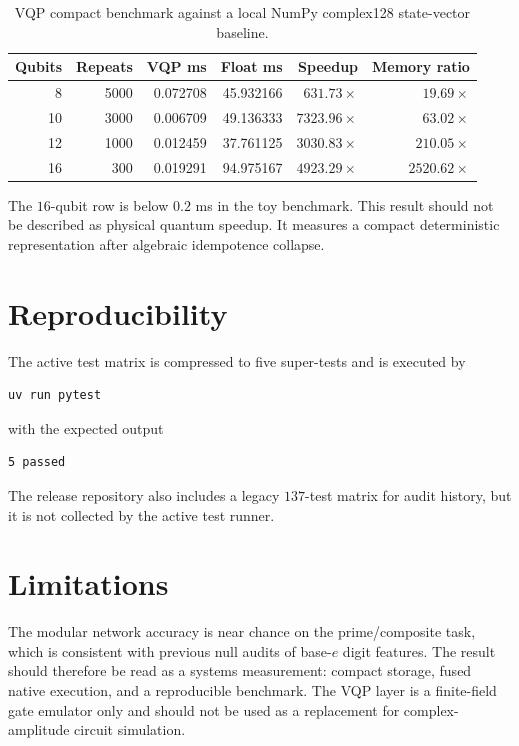 \documentclass[11pt]{article}
\begin{document}
\begin{table}[h]
\centering
\caption{VQP compact benchmark against a local NumPy complex128 state-vector
baseline.}
\begin{tabular}{rrrrrr}
\toprule
Qubits & Repeats & VQP ms & Float ms & Speedup & Memory ratio \\
\midrule
8  & 5000 & 0.072708 & 45.932166 & $631.73\times$ & $19.69\times$ \\
10 & 3000 & 0.006709 & 49.136333 & $7323.96\times$ & $63.02\times$ \\
12 & 1000 & 0.012459 & 37.761125 & $3030.83\times$ & $210.05\times$ \\
16 & 300  & 0.019291 & 94.975167 & $4923.29\times$ & $2520.62\times$ \\
\bottomrule
\end{tabular}
\end{table}

The $16$-qubit row is below $0.2$ ms in the toy benchmark.  This result should
not be described as physical quantum speedup.  It measures a compact
deterministic representation after algebraic idempotence collapse.

\section{Reproducibility}

The active test matrix is compressed to five super-tests and is executed by
\begin{verbatim}
uv run pytest
\end{verbatim}
with the expected output
\begin{verbatim}
5 passed
\end{verbatim}
The release repository also includes a legacy $137$-test matrix for audit
history, but it is not collected by the active test runner.

\section{Limitations}

The modular network accuracy is near chance on the prime/composite task, which
is consistent with previous null audits of base-$e$ digit features.  The result
should therefore be read as a systems measurement: compact storage, fused
native execution, and a reproducible benchmark.  The VQP layer is a finite-field
gate emulator only and should not be used as a replacement for
complex-amplitude circuit simulation.
\end{document}
